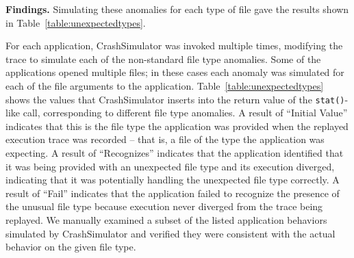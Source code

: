 
{\bf Findings.}
Simulating these anomalies for each type of file
gave the results shown in Table~\ref{table:unexpectedtypes}. 


For each application, CrashSimulator was invoked multiple times,
modifying the trace to simulate each of the non-standard file type anomalies.
Some of the applications opened multiple files; in these cases each
anomaly was simulated for each of the file arguments to the application.
Table~\ref{table:unexpectedtypes} 
shows the values that CrashSimulator inserts into
the return value of the {\tt stat()}-like call, corresponding to
different file type anomalies.
A result of ``Initial Value''
indicates that this is the file type the application was provided when the
replayed execution trace was recorded -- that is, a file of the type the
application was expecting.  A result of ``Recognizes'' indicates that the
application identified that it was being provided with an unexpected file type
and its execution diverged, indicating that it was
potentially handling the unexpected file type correctly.  A result of ``Fail''
indicates that the application failed to recognize the presence of the unusual
file type because execution never diverged from the trace being replayed.
We manually examined a subset of the listed application behaviors simulated by
CrashSimulator and verified they were consistent with the actual behavior on the
given file type.

